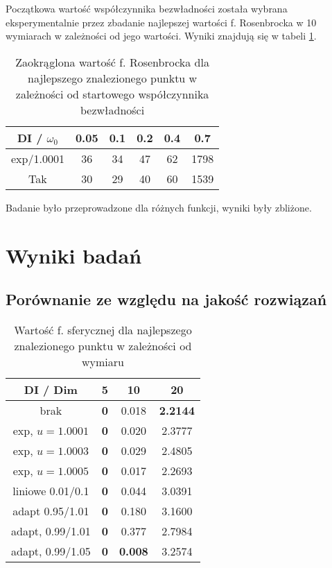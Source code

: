 \documentclass[12pt]{article}
\begin{document}
Początkowa wartość współczynnika bezwładności została wybrana eksperymentalnie przez zbadanie najlepszej wartości f. Rosenbrocka w 10 wymiarach w zależności od
jego wartości. Wyniki znajdują się w tabeli \ref{tab:test_rosenbrock}.

\begin{table}[h]
	\centering
	\begin{tabular}{|c|c|c|c|c|c|}
		\hline
		DI / $\omega_0$ & 0.05 & 0.1 & 0.2 & 0.4 & 0.7  \\
		\hline
		exp/1.0001      & 36   & 34  & 47  & 62  & 1798 \\
		Tak             & 30   & 29  & 40  & 60  & 1539 \\
		\hline
	\end{tabular}
	\caption{Zaokrąglona wartość f. Rosenbrocka dla najlepszego znalezionego punktu w zależności od startowego współczynnika bezwładności}
	\label{tab:test_rosenbrock}
\end{table}


Badanie było przeprowadzone dla różnych funkcji, wyniki były zbliżone.


\pagebreak
\section{Wyniki badań}
\subsection*{Porównanie ze względu na jakość rozwiązań}

\begin{table}[ht]
	\centering
	\begin{tabular}{|c|c|c|c|}
		\hline
		DI  / Dim        & 5          & 10             & 20              \\
		\hline
		brak             & \textbf{0} & 0.018          & \textbf{2.2144} \\
		exp, $u=1.0001$  & \textbf{0} & 0.020          & 2.3777          \\
		exp, $u=1.0003$  & \textbf{0} & 0.029          & 2.4805          \\
		exp, $u=1.0005$  & \textbf{0} & 0.017          & 2.2693          \\
		liniowe 0.01/0.1 & \textbf{0} & 0.044          & 3.0391          \\
		adapt 0.95/1.01  & \textbf{0} & 0.180          & 3.1600          \\
		adapt, 0.99/1.01 & \textbf{0} & 0.377          & 2.7984          \\
		adapt, 0.99/1.05 & \textbf{0} & \textbf{0.008} & 3.2574          \\
		\hline
	\end{tabular}
	\caption{Wartość f. sferycznej dla najlepszego znalezionego punktu w zależności od wymiaru}
	\label{tab:sphere_values}
\end{table}
\end{document}
